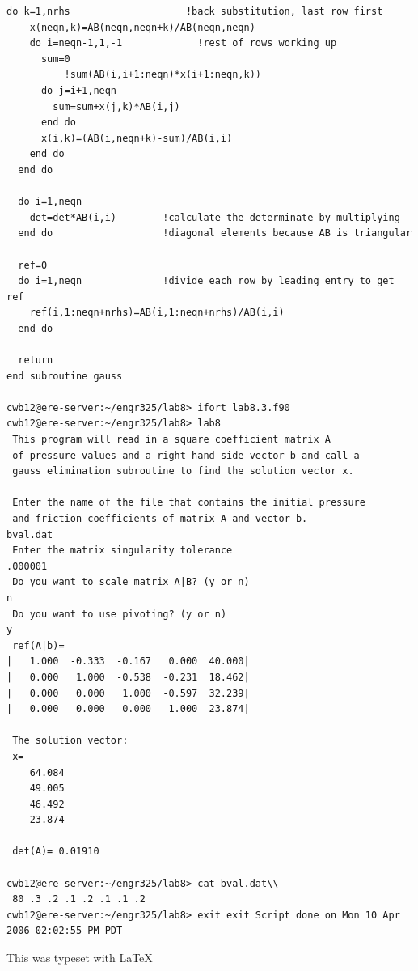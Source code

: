 \documentclass[titlepage,12pt,onehalfspacing]{article}
\begin{document}
\begin{singlespacing}
\begin{Verbatim}[frame=single]
  do k=1,nrhs                    !back substitution, last row first
    x(neqn,k)=AB(neqn,neqn+k)/AB(neqn,neqn)
    do i=neqn-1,1,-1             !rest of rows working up
      sum=0
          !sum(AB(i,i+1:neqn)*x(i+1:neqn,k))
      do j=i+1,neqn
        sum=sum+x(j,k)*AB(i,j)
      end do
      x(i,k)=(AB(i,neqn+k)-sum)/AB(i,i)
    end do
  end do

  do i=1,neqn
    det=det*AB(i,i)        !calculate the determinate by multiplying
  end do                   !diagonal elements because AB is triangular

  ref=0
  do i=1,neqn              !divide each row by leading entry to get ref
    ref(i,1:neqn+nrhs)=AB(i,1:neqn+nrhs)/AB(i,i)
  end do

  return
end subroutine gauss

cwb12@ere-server:~/engr325/lab8> ifort lab8.3.f90
cwb12@ere-server:~/engr325/lab8> lab8
 This program will read in a square coefficient matrix A
 of pressure values and a right hand side vector b and call a
 gauss elimination subroutine to find the solution vector x.

 Enter the name of the file that contains the initial pressure
 and friction coefficients of matrix A and vector b.
bval.dat
 Enter the matrix singularity tolerance
.000001
 Do you want to scale matrix A|B? (y or n)
n
 Do you want to use pivoting? (y or n)
y
 ref(A|b)=
|   1.000  -0.333  -0.167   0.000  40.000|
|   0.000   1.000  -0.538  -0.231  18.462|
|   0.000   0.000   1.000  -0.597  32.239|
|   0.000   0.000   0.000   1.000  23.874|

 The solution vector:
 x=
    64.084
    49.005
    46.492
    23.874

 det(A)= 0.01910

cwb12@ere-server:~/engr325/lab8> cat bval.dat\\
 80 .3 .2 .1 .2 .1 .1 .2
cwb12@ere-server:~/engr325/lab8> exit exit Script done on Mon 10 Apr
2006 02:02:55 PM PDT
\end{Verbatim}
\end{singlespacing}
\noindent This was typeset with \LaTeX
\end{document}
